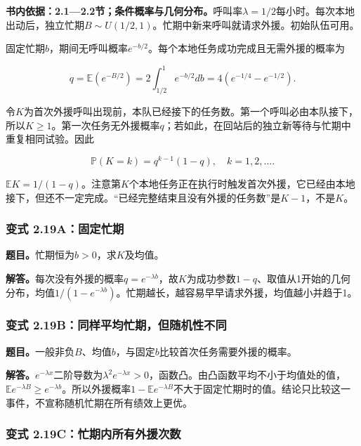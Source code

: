 \documentclass[12pt,a4paper,UTF8,fontset=fandol]{ctexart}
\begin{document}
\textbf{书内依据：2.1---2.2节；条件概率与几何分布。}呼叫率\(\lambda=1/2\)每小时。每次本地出动后，独立忙期\(B\sim U(1/2,1)\)。忙期中新来呼叫就请求外援。初始队伍可用。

固定忙期\(b\)，期间无呼叫概率\(e^{-b/2}\)。每个本地任务成功完成且无需外援的概率为

\[
q=\mathbb E(e^{-B/2})=2\int_{1/2}^1 e^{-b/2}db
=4(e^{-1/4}-e^{-1/2}).
\]

令\(K\)为首次外援呼叫出现前，本队已经接下的任务数。第一个呼叫必由本队接下，所以\(K\ge1\)。第一次任务无外援概率\(q\)；若如此，在回站后的独立新等待与忙期中重复相同试验。因此

\[
\boxed{\mathbb P(K=k)=q^{k-1}(1-q),\quad k=1,2,\ldots.}
\]

\(\mathbb EK=1/(1-q)\)。注意第\(K\)个本地任务正在执行时触发首次外援，它已经由本地接下，但还不一定完成。``已经完整结束且没有外援的任务数''是\(K-1\)，不是\(K\)。

\subsubsection{变式
2.19A：固定忙期}\label{ux53d8ux5f0f-2.19aux56faux5b9aux5fd9ux671f}

\textbf{题目。}忙期恒为\(b>0\)，求\(K\)及均值。

\textbf{解答。}每次没有外援的概率\(q=e^{-\lambda b}\)，故\(K\)为成功参数\(1-q\)、取值从1开始的几何分布，均值\(1/(1-e^{-\lambda b})\)。忙期越长，越容易早早请求外援，均值越小并趋于1。

\subsubsection{变式
2.19B：同样平均忙期，但随机性不同}\label{ux53d8ux5f0f-2.19bux540cux6837ux5e73ux5747ux5fd9ux671fux4f46ux968fux673aux6027ux4e0dux540c}

\textbf{题目。}一般非负\(B\)、均值\(b\)，与固定\(b\)比较首次任务需要外援的概率。

\textbf{解答。}\(e^{-\lambda x}\)二阶导数为\(\lambda^2e^{-\lambda x}>0\)，函数凸。由凸函数平均不小于均值处的值，\(\mathbb Ee^{-\lambda B}\ge e^{-\lambda b}\)。所以外援概率\(1-\mathbb Ee^{-\lambda B}\)不大于固定忙期时的值。结论只比较这一事件，不宣称随机忙期在所有绩效上更优。

\subsubsection{变式
2.19C：忙期内所有外援次数}\label{ux53d8ux5f0f-2.19cux5fd9ux671fux5185ux6240ux6709ux5916ux63f4ux6b21ux6570}
\end{document}
